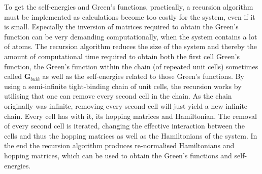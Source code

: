 To get the self-energies and Green's functions, practically, a recursion algorithm must be implemented as calculations become too costly for the system, even if it is small. Especially the inversion of matrices required to obtain the Green's function can be very demanding computationally, when the system contains a lot of atoms. The recursion algorithm reduces the size of the system and thereby the amount of computational time required to obtain both the first cell Green's function, the Green's function within the chain (of repeated unit cells) sometimes called \(\mathbf{G}_{bulk}\) as well as the self-energies related to those Green's functions. By using a semi-infinite tight-binding chain of unit cells, the recursion works by utilising that one can remove every second cell in the chain. As the chain originally was infinite, removing every second cell will just yield a new infinite chain. Every cell has with it, its hopping matrices and Hamiltonian. The removal of every second cell is iterated, changing the effective interaction between the cells and thus the hopping matrices as well as the Hamiltonians of the system. In the end the recursion algorithm produces re-normalised Hamiltonians and hopping matrices, which can be used to obtain the Green's functions and self-energies.

